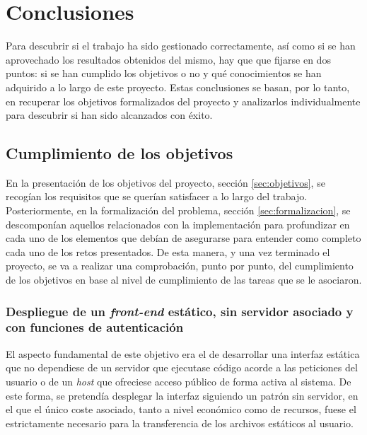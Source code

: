 \documentclass[11pt,spanish,listoffigures]{tfgetsinf}
\begin{document}

\section{Conclusiones}

Para descubrir si el trabajo ha sido gestionado correctamente, así como si se han aprovechado los resultados obtenidos del mismo, hay que que fijarse en dos puntos: si se han cumplido los objetivos o no y qué conocimientos se han adquirido a lo largo de este proyecto. Estas conclusiones se basan, por lo tanto, en recuperar los objetivos formalizados del proyecto y analizarlos individualmente para descubrir si han sido alcanzados con éxito.

\subsection{Cumplimiento de los objetivos}

En la presentación de los objetivos del proyecto, sección \ref{sec:objetivos}, se recogían los requisitos que se querían satisfacer a lo largo del trabajo. Posteriormente, en la formalización del problema, sección \ref{sec:formalizacion}, se descomponían aquellos relacionados con la implementación para profundizar en cada uno de los elementos que debían de asegurarse para entender como completo cada uno de los retos presentados. De esta manera, y una vez terminado el proyecto, se va a realizar una comprobación, punto por punto, del cumplimiento de los objetivos en base al nivel de cumplimiento de las tareas que se le asociaron.

\subsubsection{Despliegue de un \textit{front-end} estático, sin servidor asociado y con funciones de autenticación}
\label{subsubsec:conclusiones1}

El aspecto fundamental de este objetivo era el de desarrollar una interfaz estática que no dependiese de un servidor que ejecutase código acorde a las peticiones del usuario o de un \textit{host} que ofreciese acceso público de forma activa al sistema. De este forma, se pretendía desplegar la interfaz siguiendo un patrón sin servidor, en el que el único coste asociado, tanto a nivel económico como de recursos, fuese el estrictamente necesario para la transferencia de los archivos estáticos al usuario. 
\end{document}
